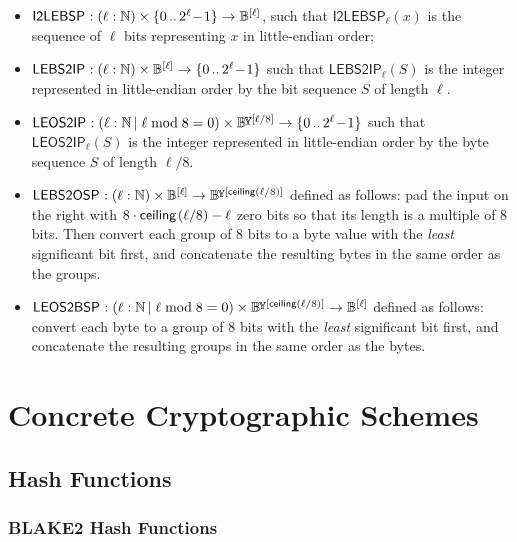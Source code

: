 \documentclass{article}
\newcommand{\typecolon}{:}
\newcommand{\bit}{\mathbb{B}}
\newcommand{\overlap}[2]{\rlap{#2}\hspace{#1}{#2}}
\newcommand{\byte}{\mathbb{B}\kern -0.1em\raisebox{0.48ex}{\overlap{0.0001em}{\scalebox{0.7}{$\mathbb{Y}$}}}}
\newcommand{\Nat}{\mathbb{N}}
\newcommand{\typeexp}[2]{{#1}\vphantom{)}^{[{#2}]}}
\newcommand{\bitseq}[1]{\typeexp{\bit}{#1}}
\newcommand{\byteseq}[1]{\typeexp{\byte}{#1}}
\newcommand{\setof}[1]{\{{#1}\}}
\newcommand{\barerange}[2]{{{#1}\,..\,{#2}}}
\newcommand{\range}[2]{\setof{\barerange{#1}{#2}}}
\newcommand{\binaryrange}[1]{\range{0}{2^{#1}\!-\!1}}
\newcommand{\ceiling}[1]{\mathsf{ceiling}\kern-0.06em\left({#1}\right)}
\newcommand{\sceiling}[1]{\mathsf{ceiling}\left({#1}\right)}
\newcommand{\mult}{\cdot}
\newcommand{\suchthat}{\,\vert\;}
\newcommand{\ItoLEBSP}[1]{\mathsf{I2LEBSP}_{#1}}
\newcommand{\LEBStoIP}[1]{\mathsf{LEBS2IP}_{#1}}
\newcommand{\LEOStoIP}[1]{\mathsf{LEOS2IP}_{#1}}
\newcommand{\LEBStoOSP}[1]{\mathsf{LEBS2OSP}_{#1}}
\newcommand{\LEOStoBSP}[1]{\mathsf{LEOS2BSP}_{#1}}
\begin{document}
\begin{itemize}
  \item $\ItoLEBSP{} \typecolon (\ell \typecolon \Nat) \times \binaryrange{\ell} \rightarrow \bitseq{\ell}$,
        such that $\ItoLEBSP{\ell}(x)$ is the sequence of $\ell$ bits representing $x$ in
        little-endian order;
  \item $\LEBStoIP{} \typecolon (\ell \typecolon \Nat) \times \bitseq{\ell} \rightarrow \binaryrange{\ell}$
        such that $\LEBStoIP{\ell}(S)$ is the integer represented in little-endian order by the
        bit sequence $S$ of length $\ell$.
  \item $\LEOStoIP{} \typecolon (\ell \typecolon \Nat \suchthat \ell \bmod 8 = 0) \times \byteseq{\ell/8} \rightarrow \binaryrange{\ell}$
        such that $\LEOStoIP{\ell}(S)$ is the integer represented in little-endian order by the
        byte sequence $S$ of length $\ell/8$.
  \item $\LEBStoOSP{} \typecolon (\ell \typecolon \Nat) \times \bitseq{\ell} \rightarrow \byteseq{\sceiling{\ell/8}}$
        defined as follows: pad the input on the right with $8 \mult \ceiling{\ell/8} - \ell$ zero bits
        so that its length is a multiple of 8 bits. Then convert each group of 8 bits to a byte
        value with the \emph{least} significant bit first, and concatenate the resulting bytes
        in the same order as the groups.
  \item $\LEOStoBSP{} \typecolon (\ell \typecolon \Nat \suchthat \ell \bmod 8 = 0) \times \byteseq{\sceiling{\ell/8}} \rightarrow \bitseq{\ell}$
        defined as follows: convert each byte to a group of 8 bits with the \emph{least} significant
        bit first, and concatenate the resulting groups in the same order as the bytes.
\end{itemize}


\section{Concrete Cryptographic Schemes} \label{concreteschemes}

\subsection{Hash Functions} \label{concretehashes}

\subsubsection{BLAKE2 Hash Functions} \label{concreteblake2}
\end{document}
